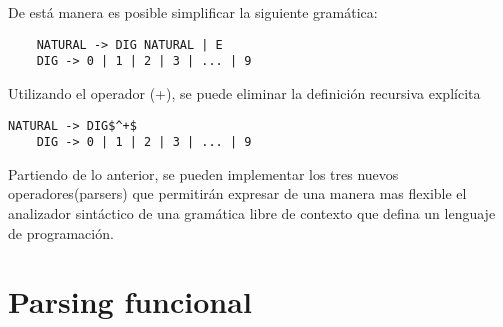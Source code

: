 	De está manera es posible simplificar la siguiente gramática:
	
	\begin{lstlisting}
	NATURAL -> DIG NATURAL | E
	DIG -> 0 | 1 | 2 | 3 | ... | 9
	\end{lstlisting}
	
	Utilizando el operador (+), se puede eliminar la definición recursiva explícita
	
	\begin{lstlisting}[mathescape]
	NATURAL -> DIG$^+$
	DIG -> 0 | 1 | 2 | 3 | ... | 9
	\end{lstlisting}
	
	Partiendo de lo anterior, se pueden implementar los tres nuevos operadores(parsers) que permitirán expresar de una manera mas flexible el analizador sintáctico de una gramática libre de contexto que defina un lenguaje de programación.
	
	
\section{Parsing funcional}




